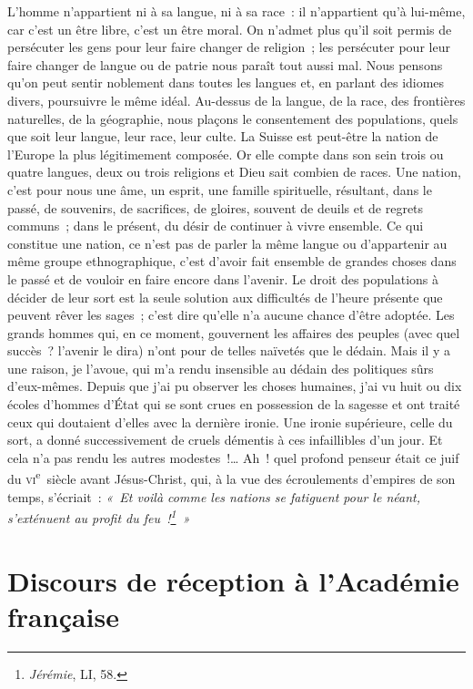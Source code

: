 \documentclass[french,twoside]{book} %
\newcommand\orgName[1]{#1}
\newcommand\persName[1]{#1}
\newcommand\placeName[1]{#1}
\newcommand{\dateline}[1]{\medskip{\RaggedLeft{#1}\par}\bigskip}
\begin{document}
L’homme n’appartient ni à sa langue, ni à sa race : il n’appartient qu’à lui-même, car c’est un être libre, c’est un être moral. On n’admet plus qu’il soit permis de persécuter les gens pour leur faire changer de religion ; les persécuter pour leur faire changer de langue ou de patrie nous paraît tout aussi mal. Nous pensons qu’on peut sentir noblement dans toutes les langues et, en parlant des idiomes divers, poursuivre le même idéal. Au-dessus de la langue, de la race, des frontières naturelles, de la géographie, nous plaçons le consentement des populations, quels que soit leur langue, leur race, leur culte. La {\placeName Suisse} est peut-être la nation de l’{\persName Europe} la plus légitimement composée. Or elle compte dans son sein trois ou quatre langues, deux ou trois religions et Dieu sait combien de races. Une nation, c’est pour nous une âme, un esprit, une famille spirituelle, résultant, dans le passé, de souvenirs, de sacrifices, de gloires, souvent de deuils et de regrets communs ; dans le présent, du désir de continuer à vivre ensemble. Ce qui constitue une nation, ce n’est pas de parler la même langue ou d’appartenir au même groupe ethnographique, c’est d’avoir fait ensemble de grandes choses dans le passé et de vouloir en faire encore dans l’avenir. Le droit des populations à décider de leur sort est la seule solution aux difficultés de l’heure présente que peuvent rêver les sages ; c’est dire qu’elle n’a aucune chance d’être adoptée. Les grands hommes qui, en ce moment, gouvernent les affaires des peuples (avec quel succès ? l’avenir le dira) n’ont pour de telles naïvetés que le dédain. Mais il y a une raison, je l’avoue, qui m’a rendu insensible au dédain des politiques sûrs d’eux-mêmes. Depuis que j’ai pu observer les choses humaines, j’ai vu huit ou dix écoles d’hommes d’État qui se sont crues en possession de la sagesse et ont traité ceux qui doutaient d’elles avec la dernière ironie. Une ironie supérieure, celle du sort, a donné successivement de cruels démentis à ces infaillibles d’un jour. Et cela n’a pas rendu les autres modestes !… Ah ! quel profond penseur était ce juif du \textsc{vi}\textsuperscript{e} siècle avant Jésus-Christ, qui, à la vue des écroulements d’empires de son temps, s’écriait : \emph{« Et voilà comme les nations se fatiguent pour le néant, s’exténuent au profit du feu !\footnote{\emph{Jérémie}, LI, 58.} »}\par

\dateline{Dimanche, 8 mai 1887.}
\section[{Discours de réception à l’Académie française}]{Discours de réception à l’{\orgName Académie française}}\renewcommand{\leftmark}{Discours de réception à l’{\orgName Académie française}}
\end{document}
